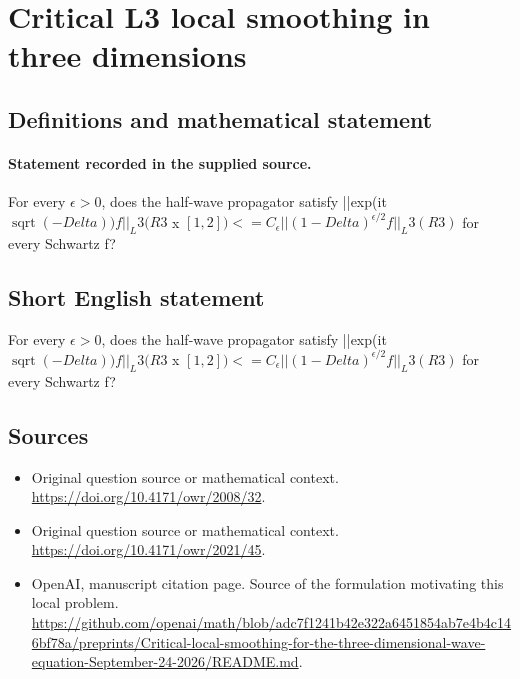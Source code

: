\documentclass[11pt]{article}
\begin{document}
\section*{Critical L3 local smoothing in three dimensions}\label{statement}
\subsection{Definitions and mathematical statement}
\paragraph{Statement recorded in the supplied source.}
For every $\epsilon >0$, does the half-wave propagator satisfy ||exp(it $\operatorname{sqrt}(-Delta))f||_L3(R3$ x $[1,2])<=C_\epsilon ||(1-Delta)^{\epsilon /2}f||_L3(R3)$ for every Schwartz f?
\subsection{Short English statement}
For every $\epsilon >0$, does the half-wave propagator satisfy ||exp(it $\operatorname{sqrt}(-Delta))f||_L3(R3$ x $[1,2])<=C_\epsilon ||(1-Delta)^{\epsilon /2}f||_L3(R3)$ for every Schwartz f?
\subsection{Sources}
\begin{itemize}
\item[S1] Original question source or mathematical context.
\url{https://doi.org/10.4171/owr/2008/32}.
\item[S2] Original question source or mathematical context.
\url{https://doi.org/10.4171/owr/2021/45}.
\item[S3] OpenAI, manuscript citation page. Source of the formulation motivating this local problem.
\url{https://github.com/openai/math/blob/adc7f1241b42e322a6451854ab7e4b4c146bf78a/preprints/Critical-local-smoothing-for-the-three-dimensional-wave-equation-September-24-2026/README.md}.
\end{itemize}
\end{document}
